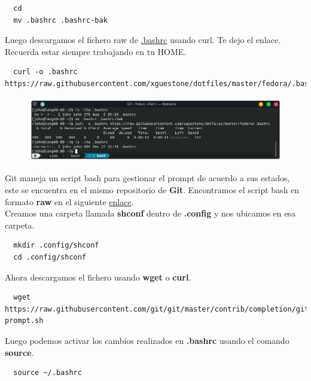 \documentclass{article}
\begin{document}
\begin{verbatim}
  cd
  mv .bashrc .bashrc-bak
\end{verbatim}

Luego descargamos el fichero raw de
\href{https://raw.githubusercontent.com/xguestone/dotfiles/master/fedora/.bashrc}{.bashrc}
usando curl. Te dejo el enlace. Recuerda estar siempre trabajando en tu HOME.

\begin{verbatim}
  curl -o .bashrc https://raw.githubusercontent.com/xguestone/dotfiles/master/fedora/.bashrc
\end{verbatim}

\newpage

\begin{figure}[h!]
  \centering
  \includegraphics[scale=0.75]{./Pictures/042_bashr_ok.png}
\end{figure}


Git maneja un script bash para gestionar el prompt de acuerdo a sus estados,
este se encuentra en el mismo repositorio de \textbf{Git}. Encontramos el
script bash en formato \textbf{raw} en el siguiente
\href{https://raw.githubusercontent.com/git/git/master/contrib/completion/git-prompt.sh}{enlace}.\\

Creamos una carpeta llamada \textbf{shconf} dentro de \textbf{.config} y nos
ubicamos en esa carpeta.

\begin{verbatim}
  mkdir .config/shconf
  cd .config/shconf
\end{verbatim}

Ahora descargamos el fichero usando \textbf{wget} o \textbf{curl}.

\begin{verbatim}
  wget https://raw.githubusercontent.com/git/git/master/contrib/completion/git-prompt.sh
\end{verbatim}

Luego podemos activar los cambios realizados en \textbf{.bashrc} usando el
comando \textbf{source}.

\begin{verbatim}
  source ~/.bashrc
\end{verbatim}
\end{document}
